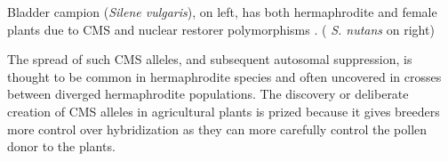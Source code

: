 {\begin{marginfigure}
\begin{center}
\end{center}
\caption{Bladder campion  ({\it Silene vulgaris}), on left, has both 
hermaphrodite and female plants due to CMS and nuclear
restorer polymorphisms \citep{charlesworth1998male}. ({\it
    S. nutans} on right)  } \label{fig:Bladder_Campion}
\end{marginfigure}  %
 The spread of such CMS alleles, and subsequent autosomal suppression, is thought to be common in hermaphrodite
species and often uncovered in crosses between diverged hermaphrodite populations.
The discovery or deliberate creation of CMS alleles in agricultural plants is
prized because it gives breeders more control over hybridization as
they can more carefully control the pollen donor to the plants.

}
